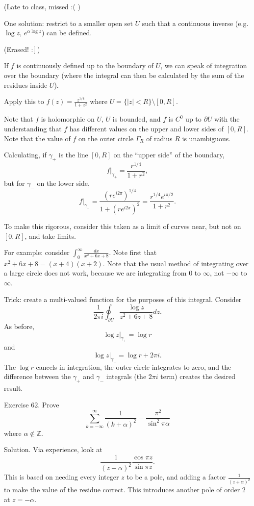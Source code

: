 \documentclass{artikel3}
\date{\formatdate{2012}{05}{04}}
\newcommand{\abs}[1]{\left|#1\right|}
\newcommand{\integers}{\mathbb{Z}}
\newcommand{\del}{\partial}
\numberwithin{equation}{enumi}
\begin{document}
(Late to class, missed :( )

One solution: restrict to a smaller open set $U$ such that
a continuous inverse (e.g. $\log z$, $e^{\alpha\log z}$)
can be defined.

(Erased! :[ )

If $f$ is continuously defined up to the boundary of $U$,
we can speak of integration over the boundary (where the
integral can then be calculated by the sum of the residues
inside $U$).

Apply this to $f(z)=\frac{z^{1/4}}{1+z^2}$ where $U=\{\abs{z}<R\}\setminus [0,R]$.

Note that $f$ is holomorphic on $U$, $U$ is bounded, and $f$ is $C^0$
up to $\del U$ with the understanding that $f$ has different
values on the upper and lower sides of $[0,R]$.  Note that
the value of $f$ on the outer circle $\Gamma_R$ of radius $R$
is unambiguous.

Calculating, if $\gamma_+$ is the line $[0,R]$ on the ``upper side''
of the boundary, \[
	f|_{\gamma_+}=\frac{r^{1/4}}{1+r^2},
\] but for $\gamma_-$ on the lower side, \[
	f|_{\gamma_-}=\frac{(re^{i2\pi})^{1/4}}{1+(re^{i2\pi})^2}=\frac{r^{1/4}e^{i\pi/2}}{1+r^2}.
\]

To make this rigorous, consider this taken as a limit of curves
near, but not on $[0,R]$, and take limits.

For example: consider $\int_0^\infty \frac{dx}{x^2+6x+8}$.
Note first that $x^2+6x+8=(x+4)(x+2)$.  Note that the usual
method of integrating over a large circle does not work,
because we are integrating from $0$ to $\infty$, not $-\infty$
to $\infty$.

Trick: create a multi-valued function for the purposes of this integral.
Consider \[
	\frac{1}{2\pi i}\oint_{\del U}\frac{\log z}{z^2+6z+8}dz.
\] As before, \[
	\log z|_{\gamma_+}=\log r
\] and \[
	\log z|_{\gamma_-}=\log r+2\pi i.
\] The $\log r$ cancels in integration, the outer circle
integrates to zero, and the difference between
the $\gamma_+$ and $\gamma_-$ integrals (the $2\pi i$ term)
creates the desired result.

Exercise 62.  Prove \[
	\sum_{k=-\infty}^{\infty}\frac{1}{(k+\alpha)^2}=\frac{\pi^2}{\sin^2\pi\alpha}
\] where $\alpha\notin \integers$.

Solution.  Via experience, look at \[
	\frac{1}{(z+\alpha)^2}\frac{\cos \pi z}{\sin\pi z}.
\] This is based on needing every integer $z$ to be a pole, and adding
a factor $\frac{1}{(z+\alpha)^2}$ to make the value of the residue
correct.  This introduces another pole of order $2$ at $z=-\alpha$.
\end{document}
